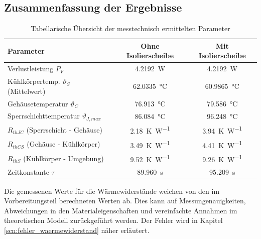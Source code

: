 \subsection{Zusammenfassung der Ergebnisse}
\begin{table}[H]
    \centering
    \renewcommand{\arraystretch}{1.3}
    \begin{tabular}{l|c|c}
        \toprule
        \textbf{Parameter}                         & \textbf{Ohne Isolierscheibe}  & \textbf{Mit Isolierscheibe}   \\
        \midrule
        Verlustleistung $P_V$                      & \SI{4.2192}{\watt}            & \SI{4.2192}{\watt}            \\
        Kühlkörpertemp. $\vartheta_S$ (Mittelwert) & \SI{62.0335}{\degreeCelsius}  & \SI{60.9865}{\degreeCelsius}  \\
        Gehäusetemperatur $\vartheta_C$            & \SI{76.913}{\degreeCelsius}   & \SI{79.586}{\degreeCelsius}   \\
        Sperrschichttemperatur $\vartheta_{J,max}$ & \SI{86.084}{\degreeCelsius}   & \SI{96.248}{\degreeCelsius}   \\
        \midrule
        $R_{thJC}$ (Sperrschicht - Gehäuse)        & \SI{2.18}{\kelvin\per\watt}   & \SI{3.94}{\kelvin\per\watt}   \\
        $R_{thCS}$ (Gehäuse - Kühlkörper)          & \SI{3.49}{\kelvin\per\watt}   & \SI{4.41}{\kelvin\per\watt}   \\
        $R_{thS}$ (Kühlkörper - Umgebung)          & \SI{9.52}{\kelvin\per\watt}   & \SI{9.26}{\kelvin\per\watt}   \\
        \midrule
        Zeitkonstante $\tau$                       & \SI{89.960}{\second}          & \SI{95.209}{\second}          \\
        \bottomrule
    \end{tabular}
    \caption{Tabellarische Übersicht der messtechnisch ermittelten Parameter}
    \label{tab:ergebnisse_gesamt}
\end{table}
Die gemessenen Werte für die Wärmewiderstände weichen von den im Vorbereitungsteil berechneten Werten ab. Dies kann auf Messungenauigkeiten, Abweichungen in den Materialeigenschaften und vereinfachte Annahmen im theoretischen Modell zurückgeführt werden. Der Fehler wird in Kapitel \ref{scn:fehler_waermewiderstand} näher erläutert.